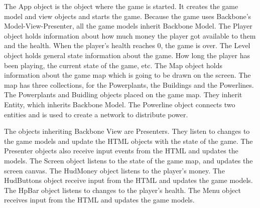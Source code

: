 The App object is the object where the game is started. It creates the game model and view objects 
and starts the game. Because the game uses Backbone's Model-View-Presenter, all the game models 
inherit Backbone Model. The Player object holds information about how much money the player got 
available to them and the health. When the player's health reaches 0, the game is over. The Level 
object holds general state information about the game. How long the player has been playing, the 
current state of the game, etc. The Map object holds information about the game map which is going 
to be drawn on the screen. The map has three collections, for the Powerplants, the Buildings and 
the Powerlines. The Powerplants and Buidling objects placed on the game map. They inherit Entity, 
which inherits Backbone Model. The Powerline object connects two entities and is used to create a
network to distribute power.

The objects inheriting Backbone View are Presenters. They listen to changes to the game models and 
update the HTML objects with the state of the game. The Presenter objects also receive input events
from the HTML and updates the models. The Screen object listens to the state of the game map, and
updates the screen canvas. The HudMoney object listens to the player's money. The HudButtons object 
receive input from the HTML and updates the game models. The HpBar object listens to changes to the 
player's health. The Menu object receives input from the HTML and updates the game models.


